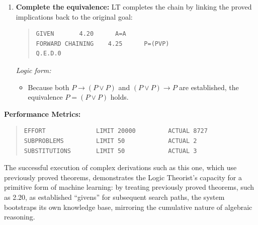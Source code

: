 \documentclass[journal]{IEEEtran}
\begin{document}
\begin{enumerate}
\item \textbf{Complete the equivalence:}
LT completes the chain by linking the proved implications back to the original goal:
\begin{quote}
\begin{verbatim}
GIVEN       4.20      A=A
FORWARD CHAINING    4.25      P=(PVP)
Q.E.D.0
\end{verbatim}
\end{quote}
\textit{Logic form:} 
\begin{itemize}
    \item[] Because both $P \rightarrow (P \lor P)$ and $(P \lor P) \rightarrow P$ are established, the equivalence $P = (P \lor P)$ holds.
\end{itemize}

\end{enumerate}

\textbf{Performance Metrics:}
\begin{quote}
\begin{verbatim}
EFFORT              LIMIT 20000         ACTUAL 8727
SUBPROBLEMS         LIMIT 50            ACTUAL 2
SUBSTITUTIONS       LIMIT 50            ACTUAL 3
\end{verbatim}
\end{quote}

\medskip

\noindent The successful execution of complex derivations such as this
one, which use previously proved theorems, demonstrates the Logic
Theorist's capacity for a primitive form of machine learning: by
treating previously proved theorems, such as 2.20, as established
``givens'' for subsequent search paths, the system bootstraps its own
knowledge base, mirroring the cumulative nature of algebraic
reasoning.

\end{document}
